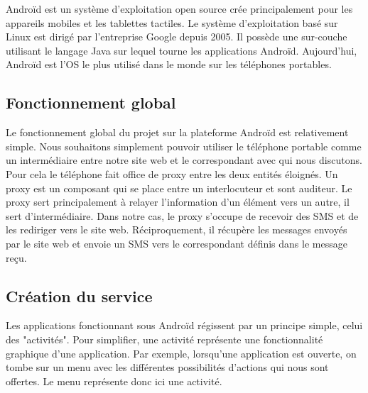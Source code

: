 Androïd est un système d'exploitation open source crée principalement pour les appareils mobiles et 
les tablettes tactiles. Le système d'exploitation basé sur Linux est dirigé par l'entreprise Google
depuis 2005. Il possède une sur-couche utilisant le langage Java sur lequel tourne les applications 
Androïd.
Aujourd'hui, Androïd est l'OS le plus utilisé dans le monde sur les téléphones portables.
\\



\subsection{Fonctionnement global}

Le fonctionnement global du projet sur la plateforme Androïd est relativement simple. Nous souhaitons
simplement pouvoir utiliser le téléphone portable comme un intermédiaire entre notre site web et le 
correspondant avec qui nous discutons. Pour cela le téléphone fait office de proxy entre les deux 
entités éloignés. Un proxy est un composant qui se place entre un interlocuteur et sont auditeur. Le 
proxy sert principalement à relayer l'information d'un élément vers un autre, il sert d'intermédiaire.
Dans notre cas, le proxy s'occupe de recevoir des SMS et de les rediriger vers le site web. 
Réciproquement, il récupère les messages envoyés par le site web et envoie un SMS vers le correspondant
définis dans le message reçu.
\\



\subsection{Création du service}

Les applications fonctionnant sous Androïd régissent par un principe simple, celui des "activités".
Pour simplifier, une activité représente une fonctionnalité graphique d'une application. Par exemple,
lorsqu'une application est ouverte, on tombe sur un menu avec les différentes possibilités d'actions 
qui nous sont offertes. Le menu représente donc ici une activité.
\\


